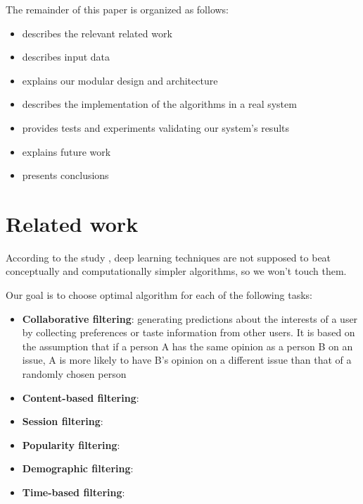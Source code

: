 \documentclass{article}
\begin{document}
        The remainder of this paper is organized as follows:
        
            \begin{itemize}
                \item {} describes the relevant related work
                \item {} describes input data
                \item {} explains our modular design and architecture
                \item {} describes the implementation of the algorithms in a real system
                \item {} provides tests and experiments validating
our system’s results
                \item {} explains future work
                \item {} presents conclusions
            \end{itemize}



    \section{Related work}
    \label{sec:related}

    According to the study \citep{progress}, deep learning techniques are not supposed to beat conceptually and computationally simpler algorithms, so we won't touch them.

    Our goal is to choose optimal algorithm for each of the following tasks:

    \begin{itemize}
        \item \textbf{Collaborative filtering}: generating predictions about the interests of a user by collecting preferences or taste information from other users. It is based on the assumption that if a person A has the same opinion as a person B on an issue, A is more likely to have B's opinion on a different issue than that of a randomly chosen person
        \item \textbf{Content-based filtering}:
        \item \textbf{Session filtering}:
        \item \textbf{Popularity filtering}:
        \item \textbf{Demographic filtering}:
        \item \textbf{Time-based filtering}:
    \end{itemize}
\end{document}
